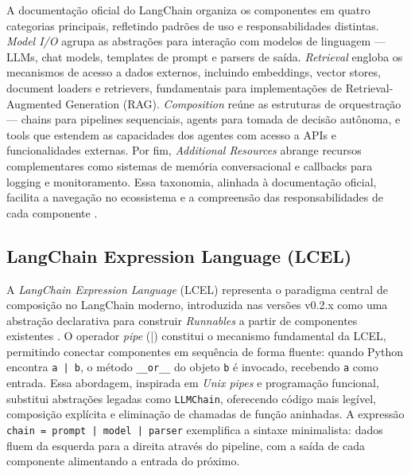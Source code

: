 \documentclass[12pt]{article}
\begin{document}

A documentação oficial do LangChain organiza os componentes em quatro categorias principais, refletindo padrões de uso e responsabilidades distintas. \textit{Model I/O} agrupa as abstrações para interação com modelos de linguagem — LLMs, chat models, templates de prompt e parsers de saída. \textit{Retrieval} engloba os mecanismos de acesso a dados externos, incluindo embeddings, vector stores, document loaders e retrievers, fundamentais para implementações de Retrieval-Augmented Generation (RAG). \textit{Composition} reúne as estruturas de orquestração — chains para pipelines sequenciais, agents para tomada de decisão autônoma, e tools que estendem as capacidades dos agentes com acesso a APIs e funcionalidades externas. Por fim, \textit{Additional Resources} abrange recursos complementares como sistemas de memória conversacional e callbacks para logging e monitoramento. Essa taxonomia, alinhada à documentação oficial, facilita a navegação no ecossistema e a compreensão das responsabilidades de cada componente \cite{langchain2023docs}.

\subsection{LangChain Expression Language (LCEL)}
\label{subsec:lcel}


A \textit{LangChain Expression Language} (LCEL) representa o paradigma central de composição no LangChain moderno, introduzida nas versões v0.2.x como uma abstração declarativa para construir \textit{Runnables} a partir de componentes existentes \cite{langchain2023docs}. O operador \textit{pipe} (|) constitui o mecanismo fundamental da LCEL, permitindo conectar componentes em sequência de forma fluente: quando Python encontra \texttt{a | b}, o método \texttt{\_\_or\_\_} do objeto \texttt{b} é invocado, recebendo \texttt{a} como entrada. Essa abordagem, inspirada em \textit{Unix pipes} e programação funcional, substitui abstrações legadas como \texttt{LLMChain}, oferecendo código mais legível, composição explícita e eliminação de chamadas de função aninhadas. A expressão \texttt{chain = prompt | model | parser} exemplifica a sintaxe minimalista: dados fluem da esquerda para a direita através do pipeline, com a saída de cada componente alimentando a entrada do próximo.
\end{document}

